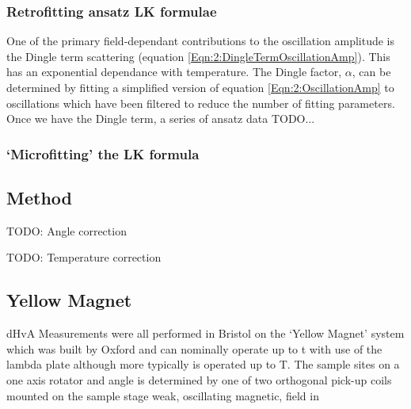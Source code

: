 \subsubsection{Retrofitting ansatz LK formulae}
\label{Sec:2:LKRetrofitting}

One of the primary field-dependant contributions to the oscillation amplitude is the Dingle term scattering (equation \ref{Eqn:2:DingleTermOscillationAmp}). This has an exponential dependance with temperature. The Dingle factor, $\alpha$, can be determined by fitting a simplified version of equation \ref{Eqn:2:OscillationAmp} to oscillations which have been filtered to reduce the number of fitting parameters. Once we have the Dingle term, a series of ansatz data TODO...




\subsubsection{`Microfitting' the LK formula}
\label{Sec:2:LKMicrofitting}

\subsection{Method}

TODO: Angle correction

TODO: Temperature correction

\subsection{Yellow Magnet}

dHvA Measurements were all performed in Bristol on the `Yellow Magnet' system which was built by Oxford and can nominally operate up to \unit[20]{t} with use of the lambda plate although more typically is operated up to \unit[18]{T}. The sample sites on a one axis rotator and angle is determined by one of two orthogonal pick-up coils mounted on the sample stage weak, oscillating magnetic, field in

